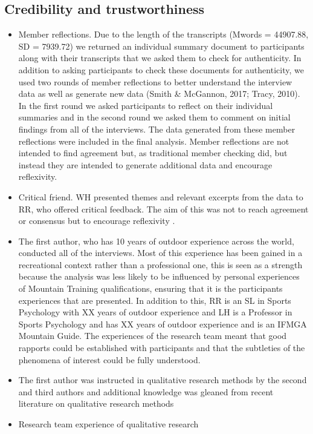 \documentclass[a4paper,]{book}
\providecommand{\tightlist}{%
  \setlength{\itemsep}{0pt}\setlength{\parskip}{0pt}}
\begin{document}
\hypertarget{credibility-and-trustworthiness}{%
\subsection{Credibility and trustworthiness}\label{credibility-and-trustworthiness}}

\begin{itemize}
\tightlist
\item
  Member reflections. Due to the length of the transcripts (Mwords = 44907.88, SD = 7939.72) we returned an individual summary document to participants along with their transcripts that we asked them to check for authenticity. In addition to asking participants to check these documents for authenticity, we used two rounds of member reflections to better understand the interview data as well as generate new data (Smith \& McGannon, 2017; Tracy, 2010). In the first round we asked participants to reflect on their individual summaries and in the second round we asked them to comment on initial findings from all of the interviews. The data generated from these member reflections were included in the final analysis. Member reflections are not intended to find agreement but, as traditional member checking did, but instead they are intended to generate additional data and encourage reflexivity.
\item
  Critical friend. WH presented themes and relevant excerpts from the data to RR, who offered critical feedback. The aim of this was not to reach agreement or consensus but to encourage reflexivity \citep{Smith2017}.
\item
  The first author, who has 10 years of outdoor experience across the world, conducted all of the interviews. Most of this experience has been gained in a recreational context rather than a professional one, this is seen as a strength because the analysis was less likely to be influenced by personal experiences of Mountain Training qualifications, ensuring that it is the participants experiences that are presented. In addition to this, RR is an SL in Sports Psychology with XX years of outdoor experience and LH is a Professor in Sports Psychology and has XX years of outdoor experience and is an IFMGA Mountain Guide. The experiences of the research team meant that good rapports could be established with participants and that the subtleties of the phenomena of interest could be fully understood.
\item
  The first author was instructed in qualitative research methods by the second and third authors and additional knowledge was gleaned from recent literature on qualitative research methods
\item
  Research team experience of qualitative research
\end{itemize}
\end{document}
